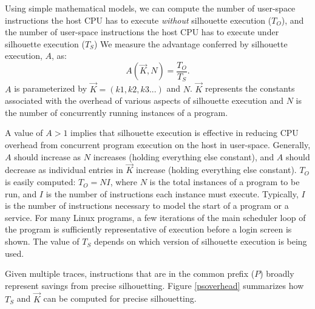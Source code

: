 \noindent Using simple mathematical models, we can compute
the number of user-space instructions the host CPU has to execute
{\em without} silhouette execution ($T_{O}$), and
the number of user-space instructions the host
CPU has to execute under silhouette execution ($T_{S}$)
We measure the advantage conferred by silhouette
execution, $A$, as:
\begin{equation}
A(\vec K, N) = \frac{T_{O}}{T_{S}}.
\end{equation}
$A$ is parameterized by $\vec K = (k1, k2, k3 ...)$
and $N$. $\vec K$ represents the constants
associated with the overhead of various aspects
of silhouette execution and $N$ is
the number of concurrently running instances
of a program.

A value of $A > 1$ implies that silhouette
execution is effective in reducing
CPU overhead from concurrent program execution
on the host in user-space. Generally, $A$ should
increase as $N$ increases (holding everything
else constant), and $A$ should decrease
as individual entries in $\vec K$ increase (holding
everything else constant).
$T_{O}$ is easily computed: $T_{O} = NI$,
where $N$ is the total instances of a program
to be run, and $I$ is the number of instructions
each instance must execute. Typically, $I$ is 
the number of instructions necessary to model
the start of a program or a service. For many Linux
programs, a few iterations of the main
scheduler loop of the program
is sufficiently representative of execution
before a login screen is shown.
The value of $T_{S}$ depends on which version
of silhouette execution is being used. \newline

 \newline
Given multiple traces, instructions that are in the common prefix ($P$) 
broadly represent savings from precise silhouetting. Figure \ref{psoverhead} summarizes
how $T_{S}$ and $\vec K$ can be computed
for precise silhouetting. \newline

